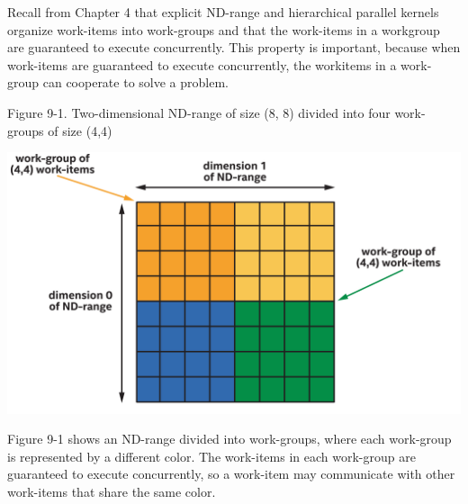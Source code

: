 Recall from Chapter 4 that explicit ND-range and hierarchical parallel kernels organize work-items into work-groups and that the work-items in a workgroup are guaranteed to execute concurrently. This property is important, because when work-items are guaranteed to execute concurrently, the workitems in a work-group can cooperate to solve a problem.\par

\hspace*{\fill} \par %
Figure 9-1. Two-dimensional ND-range of size (8, 8) divided into four work-groups of size (4,4)
\begin{center}
	\includegraphics[width=1.\textwidth]{content/chapter-9/images/2}
\end{center}

Figure 9-1 shows an ND-range divided into work-groups, where each work-group is represented by a different color. The work-items in each work-group are guaranteed to execute concurrently, so a work-item may communicate with other work-items that share the same color.\par

